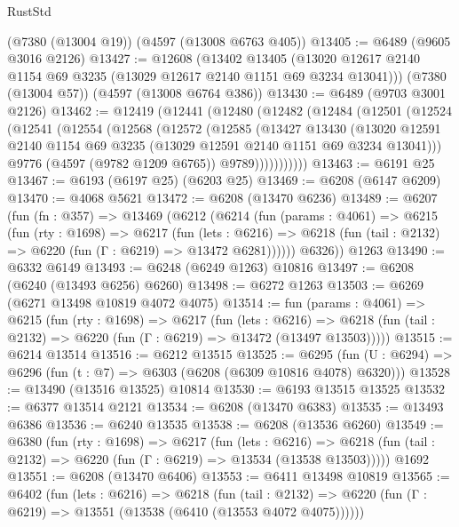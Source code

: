 \begin{lexlean}{RustStd}
\begin{coremodule}
    (@7380 (@13004 @19))
    (@4597 (@13008 @6763 @405))
@13405 := @6489 (@9605 @3016 @2126)
@13427 := @12608
    (@13402
      @13405
      (@13020 @12617 @2140 @1154 @69 @3235 (@13029 @12617 @2140 @1151 @69 @3234 @13041)))
    (@7380 (@13004 @57))
    (@4597 (@13008 @6764 @386))
@13430 := @6489 (@9703 @3001 @2126)
@13462 := @12419
    (@12441
      (@12480
        (@12482
          (@12484
            (@12501
              (@12524
                (@12541
                  (@12554
                    (@12568
                      (@12572
                        (@12585
                          (@13427
                            @13430
                            (@13020
                              @12591
                              @2140
                              @1154
                              @69
                              @3235
                              (@13029 @12591 @2140 @1151 @69 @3234 @13041)))
                          @9776
                          (@4597 (@9782 @1209 @6765))
                          @9789)))))))))))
@13463 := @6191 @25
@13467 := @6193 (@6197 @25) (@6203 @25)
@13469 := @6208 (@6147 @6209)
@13470 := @4068 @5621
@13472 := @6208 (@13470 @6236)
@13489 := @6207
    (fun (fn : @357) =>
    @13469
      (@6212
        (@6214
          (fun (params : @4061) =>
          @6215
            (fun (rty : @1698) =>
            @6217
              (fun (lets : @6216) =>
              @6218 (fun (tail : @2132) => @6220 (fun (Γ : @6219) => @13472 @6281))))))
        @6326))
    @1263
@13490 := @6332 @6149
@13493 := @6248 (@6249 @1263) @10816
@13497 := @6208 (@6240 (@13493 @6256) @6260)
@13498 := @6272 @1263
@13503 := @6269 (@6271 @13498 @10819 @4072 @4075)
@13514 := fun (params : @4061) =>
  @6215
    (fun (rty : @1698) =>
    @6217
      (fun (lets : @6216) =>
      @6218 (fun (tail : @2132) => @6220 (fun (Γ : @6219) => @13472 (@13497 @13503)))))
@13515 := @6214 @13514
@13516 := @6212 @13515
@13525 := @6295
    (fun (U : @6294) => @6296 (fun (t : @7) => @6303 (@6208 (@6309 @10816 @4078) @6320)))
@13528 := @13490 (@13516 @13525) @10814
@13530 := @6193 @13515 @13525
@13532 := @6377 @13514 @2121
@13534 := @6208 (@13470 @6383)
@13535 := @13493 @6386
@13536 := @6240 @13535
@13538 := @6208 (@13536 @6260)
@13549 := @6380
    (fun (rty : @1698) =>
    @6217
      (fun (lets : @6216) =>
      @6218 (fun (tail : @2132) => @6220 (fun (Γ : @6219) => @13534 (@13538 @13503)))))
    @1692
@13551 := @6208 (@13470 @6406)
@13553 := @6411 @13498 @10819
@13565 := @6402
    (fun (lets : @6216) =>
    @6218
      (fun (tail : @2132) =>
      @6220 (fun (Γ : @6219) => @13551 (@13538 (@6410 (@13553 @4072 @4075))))))

\end{coremodule}
\end{lexlean}
